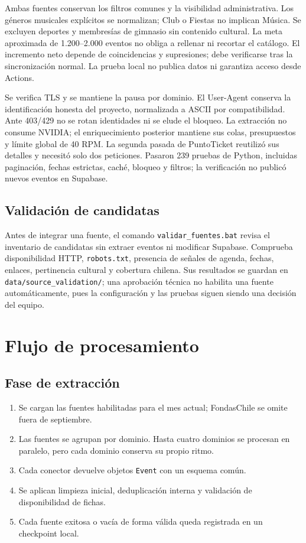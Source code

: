 \documentclass[11pt,a4paper]{article}
\begin{document}
Ambas fuentes conservan los filtros comunes y la visibilidad administrativa. Los g\'{e}neros musicales expl\'{i}citos se normalizan; Club o Fiestas no implican M\'{u}sica. Se excluyen deportes y membres\'{i}as de gimnasio sin contenido cultural. La meta aproximada de 1.200--2.000 eventos no obliga a rellenar ni recortar el cat\'{a}logo. El incremento neto depende de coincidencias y supresiones; debe verificarse tras la sincronizaci\'{o}n normal. La prueba local no publica datos ni garantiza acceso desde Actions.

Se verifica TLS y se mantiene la pausa por dominio. El User-Agent conserva la identificaci\'{o}n honesta del proyecto, normalizada a ASCII por compatibilidad. Ante 403/429 no se rotan identidades ni se elude el bloqueo. La extracci\'{o}n no consume NVIDIA; el enriquecimiento posterior mantiene sus colas, presupuestos y l\'{i}mite global de 40 RPM. La segunda pasada de PuntoTicket reutiliz\'{o} sus detalles y necesit\'{o} solo dos peticiones. Pasaron 239 pruebas de Python, incluidas paginaci\'{o}n, fechas estrictas, cach\'{e}, bloqueo y filtros; la verificaci\'{o}n no public\'{o} nuevos eventos en Supabase.

\subsection{Validaci\'{o}n de candidatas}

Antes de integrar una fuente, el comando \texttt{validar\_fuentes.bat} revisa el inventario de candidatas sin extraer eventos ni modificar Supabase. Comprueba disponibilidad HTTP, \texttt{robots.txt}, presencia de se\~{n}ales de agenda, fechas, enlaces, pertinencia cultural y cobertura chilena. Sus resultados se guardan en \texttt{data/source\_validation/}; una aprobaci\'{o}n t\'{e}cnica no habilita una fuente autom\'{a}ticamente, pues la configuraci\'{o}n y las pruebas siguen siendo una decisi\'{o}n del equipo.

\section{Flujo de procesamiento}

\subsection{Fase de extracci\'{o}n}

\begin{enumerate}
  \item Se cargan las fuentes habilitadas para el mes actual; FondasChile se omite fuera de septiembre.
  \item Las fuentes se agrupan por dominio. Hasta cuatro dominios se procesan en paralelo, pero cada dominio conserva su propio ritmo.
  \item Cada conector devuelve objetos \texttt{Event} con un esquema com\'{u}n.
  \item Se aplican limpieza inicial, deduplicaci\'{o}n interna y validaci\'{o}n de disponibilidad de fichas.
  \item Cada fuente exitosa o vac\'{i}a de forma v\'{a}lida queda registrada en un checkpoint local.
\end{enumerate}
\end{document}
